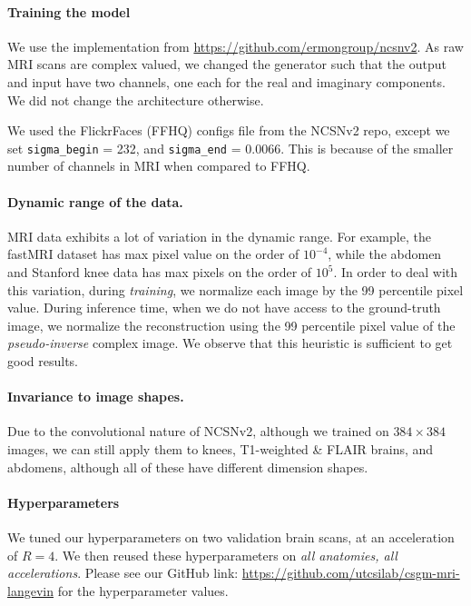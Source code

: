 \paragraph{Training the model} We use the implementation from
\url{https://github.com/ermongroup/ncsnv2}. As raw MRI scans are complex
valued, we changed the generator such that the output and input have
two channels, one each for the real and imaginary components. We did
not change the architecture otherwise.

We used the FlickrFaces (FFHQ) configs file from the NCSNv2 repo,
except we set \texttt{sigma\_begin} = 232, and \texttt{sigma\_end} =
0.0066. This is because of the smaller number of channels in MRI when
compared to FFHQ.

\paragraph{Dynamic range of the data.} MRI data exhibits a lot of
variation in the dynamic range. For example, the fastMRI dataset has
max pixel value on the order of $10^{-4}$, while the abdomen and
Stanford knee data has max pixels on the order of $10^5$. In order to
deal with this variation, during \emph{training}, we normalize each
image by the 99 percentile pixel value. During inference time, when we
do not have access to the ground-truth image, we normalize the
reconstruction using the 99 percentile pixel value of the
\emph{pseudo-inverse} complex image. We observe that this heuristic is sufficient to
get good results.

\paragraph{Invariance to image shapes.} Due to the convolutional
nature of NCSNv2, although we trained on $384\times 384$ images, we
can still apply them to knees, T1-weighted \& FLAIR brains, and
abdomens, although all of these have different dimension shapes. 

\paragraph{Hyperparameters} We tuned our hyperparameters on two validation brain scans, at an acceleration of $R=4$. We then reused these hyperparameters on \emph{all anatomies, all accelerations}. Please see our GitHub link: 
\url{https://github.com/utcsilab/csgm-mri-langevin} for the hyperparameter values.

